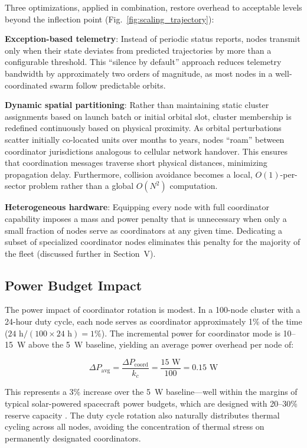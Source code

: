 \documentclass[journal]{IEEEtran}
\begin{document}
Three optimizations, applied in combination, restore overhead to acceptable levels beyond the inflection point (Fig.~\ref{fig:scaling_trajectory}):

\textbf{Exception-based telemetry}: Instead of periodic status reports, nodes transmit only when their state deviates from predicted trajectories by more than a configurable threshold. This ``silence by default'' approach reduces telemetry bandwidth by approximately two orders of magnitude, as most nodes in a well-coordinated swarm follow predictable orbits.

\textbf{Dynamic spatial partitioning}: Rather than maintaining static cluster assignments based on launch batch or initial orbital slot, cluster membership is redefined continuously based on physical proximity. As orbital perturbations scatter initially co-located units over months to years, nodes ``roam'' between coordinator jurisdictions analogous to cellular network handover. This ensures that coordination messages traverse short physical distances, minimizing propagation delay. Furthermore, collision avoidance becomes a local, $O(1)$-per-sector problem rather than a global $O(N^2)$ computation.

\textbf{Heterogeneous hardware}: Equipping every node with full coordinator capability imposes a mass and power penalty that is unnecessary when only a small fraction of nodes serve as coordinators at any given time. Dedicating a subset of specialized coordinator nodes eliminates this penalty for the majority of the fleet (discussed further in Section~V).

\subsection{Power Budget Impact}

The power impact of coordinator rotation is modest. In a 100-node cluster with a 24-hour duty cycle, each node serves as coordinator approximately 1\% of the time ($24\text{~h} / (100 \times 24\text{~h}) = 1\%$). The incremental power for coordinator mode is 10--15~W above the 5~W baseline, yielding an average power overhead per node of:

\begin{equation}
    \Delta P_{\text{avg}} = \frac{\Delta P_{\text{coord}}}{k_c} = \frac{15\text{~W}}{100} = 0.15\text{~W}
    \label{eq:power_overhead}
\end{equation}

This represents a 3\% increase over the 5~W baseline---well within the margins of typical solar-powered spacecraft power budgets, which are designed with 20--30\% reserve capacity \cite{wertz_smad}. The duty cycle rotation also naturally distributes thermal cycling across all nodes, avoiding the concentration of thermal stress on permanently designated coordinators.
\end{document}
